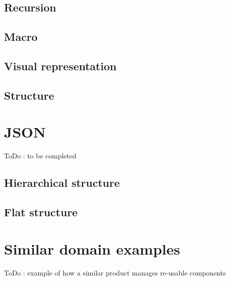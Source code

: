 \documentclass[a4paper,11pt,final]{article}
\begin{document}
\subsection{Recursion}
\subsection{Macro}
\subsection{Visual representation}
\subsection{Structure}

\newpage
\section{JSON}
ToDo : to be completed
\subsection{Hierarchical structure}
\subsection{Flat structure}

\newpage
\section{Similar domain examples}
ToDo : example of how a similar product manages re-usable components 

\newpage
\end{document}
